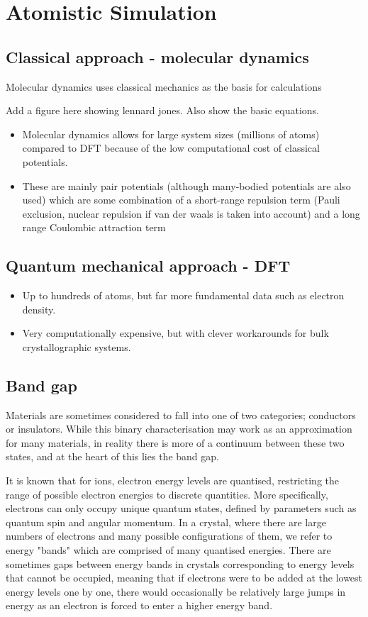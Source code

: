 \section{Atomistic Simulation}

\subsection{Classical approach - molecular dynamics}

Molecular dynamics uses classical mechanics as the basis for calculations 

Add a figure here showing lennard jones. Also show the basic equations.

\begin{itemize}
\item Molecular dynamics allows for large system sizes (millions of atoms) compared to DFT because of the low computational cost of classical potentials. 
\item These are mainly pair potentials (although many-bodied potentials are also used) which are some combination of a short-range repulsion term (Pauli exclusion, nuclear repulsion if van der waals is taken into account) and a long range Coulombic attraction term
\end{itemize}

\subsection{Quantum mechanical approach - DFT}

\begin{itemize}
\item Up to hundreds of atoms, but far more fundamental data such as electron density.
\item Very computationally expensive, but with clever workarounds for bulk crystallographic systems.
\end{itemize}

\subsection{Band gap}

Materials are sometimes considered to fall into one of two categories; conductors or insulators. While this binary characterisation may work as an approximation for many materials, in reality there is more of a continuum between these two states, and at the heart of this lies the band gap.

It is known that for ions, electron energy levels are quantised, restricting the range of possible electron energies to discrete quantities. More specifically, electrons can only occupy unique quantum states, defined by parameters such as quantum spin and angular momentum. In a crystal, where there are large numbers of electrons and many possible configurations of them, we refer to energy "bands" which are comprised of many quantised energies. There are sometimes gaps between energy bands in crystals corresponding to energy levels that cannot be occupied, meaning that if electrons were to be added at the lowest energy levels one by one, there would occasionally be relatively large jumps in energy as an electron is forced to enter a higher energy band. 


